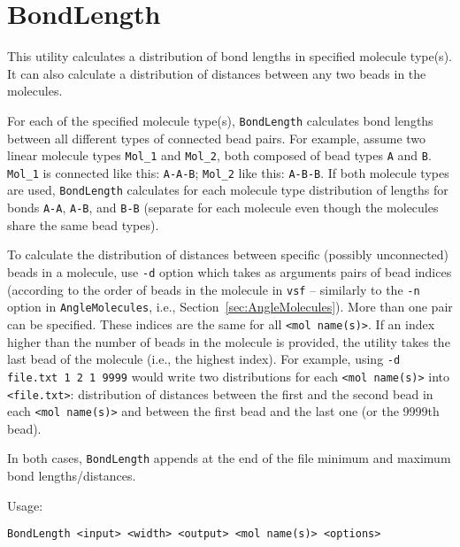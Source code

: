 \section{BondLength} \label{sec:BondLength}

This utility calculates a distribution of bond lengths in specified
molecule type(s). It can also calculate a distribution of distances between
any two beads in the molecules.

For each of the specified molecule type(s), \texttt{BondLength} calculates
bond lengths between all different types of connected bead pairs.
For example, assume two linear molecule types \texttt{Mol\_1} and
\texttt{Mol\_2}, both composed of bead types \texttt{A} and \texttt{B}.
\texttt{Mol\_1} is connected like this: \texttt{A-A-B}; \texttt{Mol\_2}
like this: \texttt{A-B-B}. If both molecule types are used,
\texttt{BondLength} calculates for each molecule type distribution of
lengths for bonds \texttt{A-A}, \texttt{A-B}, and \texttt{B-B} (separate
for each molecule even though the molecules share the same bead types).

To calculate the distribution of distances between specific (possibly
unconnected) beads in a molecule, use \texttt{-d} option which takes as
arguments pairs of bead indices (according to the order of beads in the
molecule in \texttt{vsf} -- similarly to the \texttt{-n} option in
\texttt{AngleMolecules}, i.e., Section~\ref{sec:AngleMolecules}). More than
one pair can be specified.  These indices are the same for all \texttt{<mol
name(s)>}. If an index higher than the number of beads in the molecule is
provided, the utility takes the last bead of the molecule (i.e., the
highest index). For example, using \texttt{-d file.txt 1 2 1 9999} would
write two distributions for each \texttt{<mol name(s)>} into
\texttt{<file.txt>}: distribution of distances between the first and the
second bead in each \texttt{<mol name(s)>} and between the first bead and
the last one (or the 9999th bead).

In both cases, \texttt{BondLength} appends at the end of the file minimum and
maximum bond lengths/distances.

Usage:

\vspace{1em}
\noindent
\texttt{BondLength <input> <width> <output> <mol name(s)> <options>}


